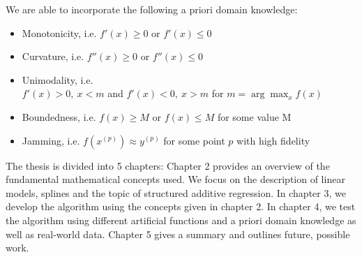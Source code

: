 \documentclass[10pt,a4paper]{article}
\begin{document}
We are able to incorporate the following a priori domain knowledge: 

\begin{itemize} \label{list:possible-constraints}
	\item Monotonicity, i.e. $f'(x) \ge 0$ or $f'(x) \le 0$
	\item Curvature, i.e. $f''(x) \ge 0$ or $f''(x) \le 0$
	\item Unimodality, i.e. \\ $f'(x) > 0, \ x < m$ and $f'(x) < 0, \ x > m$ for $m = \arg \max_{x} f(x)$
	\item Boundedness, i.e. $f(x) \ge M$ or $f(x) \le M$ for some value M
	\item Jamming, i.e. $f(x^{(p)}) \approx y^{(p)}$ for some point $p$ with high fidelity
\end{itemize}


The thesis is divided into 5 chapters: Chapter 2 provides an overview of the fundamental mathematical concepts used. We focus on the description of linear models, splines and the topic of structured additive regression. In chapter 3, we develop the algorithm using the concepts given in chapter 2. In chapter 4, we test the algorithm using different artificial functions and a priori domain knowledge as well as real-world data. Chapter 5 gives a summary and outlines future, possible work. 


	
\printbibliography
	
\end{document}
